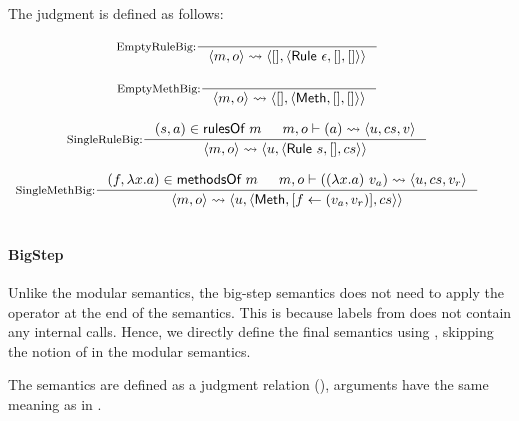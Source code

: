 \begin{definition}
  \label{def-sembigss}
  The judgment  is defined as follows:
  \begin{center}
    \begin{math}
      \begin{array}{c}
        \inference[EmptyRuleBig:]{}
                  {\sembigss{m}{o}{\emptymap}
                    {\alpharule{\epsilon}}{\emptymap}{\emptymap}} \\
        \mbox{} \\
        \inference[EmptyMethBig:]{}
                  {\sembigss{m}{o}{\emptymap}
                    {\alphameth}{\emptymap}{\emptymap}} \\
        \mbox{} \\
        \inference[SingleRuleBig:]{\rulepair{s}{a} \in \rulesofm{m} & \sembigact{m}{o}{a}{u}{cs}{v}}
                  {\sembigss{m}{o}{u}{\alpharule{s}}{\emptymap}{cs}} \\
        \mbox{} \\
        \inference[SingleMethBig:]{\methodpair{f}{\lambda x.a} \in \methsofm{m} &
          \sembigact{m}{o}{(\lambda x.a)\ v_a}{u}{cs}{v_r}}
                  {\sembigss{m}{o}{u}{\alphameth{}}{\lblupd{}{f}{(v_a, v_r)}}{cs}} \\
        \mbox{} \\
      \end{array}
    \end{math}
  \end{center}
\end{definition}

\paragraph{BigStep}

Unlike the modular semantics, the big-step semantics does not need to
apply the \hidesym{} operator at the end of the semantics. This is
because labels from \Bigsubstep{} does not contain any internal
calls. Hence, we directly define the final \Bigstep{} semantics using
\Bigsubstep{}, skipping the notion of \Substeps{} in the modular
semantics.

The \Bigstep{} semantics are defined as a judgment relation
(), arguments have the same meaning as in
\Bigsubstep{}.


